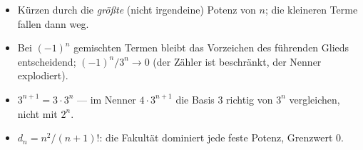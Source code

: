 \begin{achtung}
\begin{itemize}
  \item K\"urzen durch die \emph{gr\"o\ss{}te} (nicht irgendeine)
        Potenz von $n$; die kleineren Terme fallen dann weg.
  \item Bei $(-1)^n$ gemischten Termen bleibt das Vorzeichen des
        f\"uhrenden Glieds entscheidend; $(-1)^n/3^n\to0$ (der Z\"ahler
        ist beschr\"ankt, der Nenner explodiert).
  \item $3^{n+1}=3\cdot3^n$ --- im Nenner $4\cdot3^{n+1}$ die Basis $3$
        richtig von $3^n$ vergleichen, nicht mit $2^n$.
  \item $d_n=n^2/(n+1)!$: die Fakult\"at dominiert jede feste Potenz,
        Grenzwert $0$.
\end{itemize}
\end{achtung}
